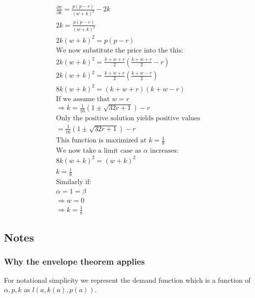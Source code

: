 \begin{align*}
\frac{\partial \pi}{\partial k} = \frac{ p(p-r)}{(w
+k)^2} -2k \\
2k= \frac{ p(p-r)}{(w
+k)^2} \\
2k(w+k)^2=p(p-r) \\
\text{We now substitute the price into the this: } \\
2k(w+k)^2=\frac{k+ w+r}{2} \left(\frac{k+ w+r}{2}-r \right) \\
2k(w+k)^2=\frac{k+ w+r}{2} \left(\frac{k+ w-r}{2} \right) \\
8k(w+k)^2= \left( k+ w+r \right) \left(k+ w-r\right) \\
\text{If we assume that $w=r$} \\
\Rightarrow 
k = \frac{1}{16} \left(1\pm \sqrt{32 r+1}\right) - r\\
\text{Only the positive solution yields positive values} \\
= \frac{1}{16} \left(1\pm \sqrt{32 r+1}\right) - r \\
\text{This function is maximized at $k=\frac{1}{8}$} \\
\text{We now take a limit case as $\alpha$ increases:} \\
8k(w+k)^2= \left( w+ k \right)^2 \\
k = \frac{1}{8} \\
\text{Similarly if:} \\
\alpha=1=\beta \\
\Rightarrow w = 0 \\
\Rightarrow k = \frac{1}{8} 
\end{align*}

\subsection{Notes} \label{notes}

\subsubsection{Why the envelope theorem applies} \label{envelopetheorem}


For notational simplicity we represent the demand function which is a function of $\alpha, p, k$ as $l(a, k(a),p(a))$.  

